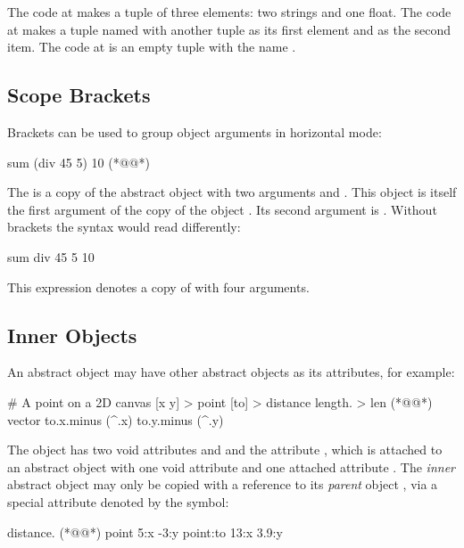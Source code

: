 The code at  makes a tuple of three elements: two strings
and one float. The code at  makes a tuple named  with another
tuple as its first element and  as the second item.
The code at  is an empty tuple with the name .

\subsection{Scope Brackets}

Brackets can be used to group object arguments in horizontal mode:

\begin{ffcode}
sum (div 45 5) 10  (*@\label{ln:sum}@*)
\end{ffcode}

The  is a copy of the abstract object 
with two arguments  and . This object is itself
the first argument of the copy of the object . Its second
argument is . Without brackets the syntax would read differently:

\begin{ffcode}
sum div 45 5 10
\end{ffcode}

This expression denotes a copy of  with four arguments.

\subsection{Inner Objects}

An abstract object may have other abstract objects as its attributes,
for example:

\begin{ffcode}
# A point on a 2D canvas
[x y] > point
  [to] > distance
    length. > len (*@\label{ln:vector-length}@*)
      vector
        to.x.minus (^.x)
        to.y.minus (^.y)
\end{ffcode}

The object  has two void attributes  and 
and the attribute , which is attached to an abstract
object with one void attribute  and one attached attribute .
The \emph{inner} abstract object  may only be copied
with a reference to its \emph{parent} object , via
a special attribute denoted by the \ff{\^{}} symbol:

\begin{ffcode}
distance. (*@\label{ln:point-copy}@*)
  point
    5:x
    -3:y
  point:to
    13:x
    3.9:y
\end{ffcode}

